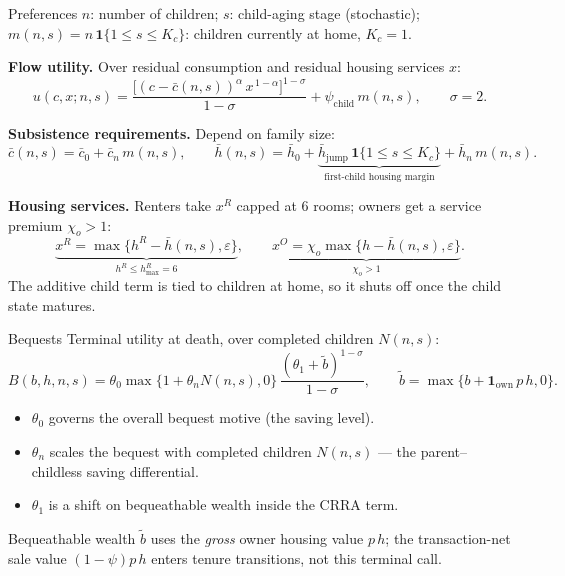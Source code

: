 \documentclass[aspectratio=169,10pt]{beamer}
\providecommand{\1}{\mathbf 1}
\begin{document}
\begin{frame}{Preferences}
  {\small $n$: number of children; $s$: child-aging stage (stochastic); $m(n,s)=n\,\1\{1\le s\le K_c\}$: children currently at home, $K_c=1$.}

  \textbf{Flow utility.} Over residual consumption and residual housing services $x$:
  \[
  u(c,x;n,s)=\frac{\big[(c-\bar c(n,s))^{\alpha}\,x^{\,1-\alpha}\big]^{1-\sigma}}{1-\sigma}+\psi_{\mathrm{child}}\,m(n,s),
  \qquad \sigma=2.
  \]

  \textbf{Subsistence requirements.} Depend on family size:
  \[
  \bar c(n,s)=\bar c_0+\bar c_n\,m(n,s),\qquad
  \bar h(n,s)=\bar h_0+\underbrace{\bar h_{\mathrm{jump}}\,\1\{1\le s\le K_c\}}_{\text{first-child housing margin}}+\bar h_n\,m(n,s).
  \]

  \textbf{Housing services.} Renters take $x^R$ capped at $6$ rooms; owners get a service premium $\chi_o>1$:
  \[
  \underbrace{x^R=\max\{h^R-\bar h(n,s),\varepsilon\}}_{h^R\le h^R_{\max}=6},
  \qquad
  \underbrace{x^O=\chi_o\max\{h-\bar h(n,s),\varepsilon\}}_{\chi_o>1}.
  \]
  The additive child term is tied to children at home, so it shuts off once the child state matures.
\end{frame}

\begin{frame}{Bequests}
  Terminal utility at death, over completed children $N(n,s)$:
  \[
  B(b,h,n,s)=\theta_0\max\{1+\theta_n N(n,s),0\}\,\frac{(\theta_1+\tilde b)^{1-\sigma}}{1-\sigma},
  \qquad
  \tilde b=\max\{b+\1_{\mathrm{own}}\,p\,h,0\}.
  \]
  \begin{itemize}
    \item $\theta_0$ governs the overall bequest motive (the saving level).
    \item $\theta_n$ scales the bequest with completed children $N(n,s)$ --- the parent--childless saving differential.
    \item $\theta_1$ is a shift on bequeathable wealth inside the CRRA term.
  \end{itemize}
  Bequeathable wealth $\tilde b$ uses the \emph{gross} owner housing value $p\,h$; the transaction-net sale value $(1-\psi)p\,h$ enters tenure transitions, not this terminal call.
\end{frame}
\end{document}
